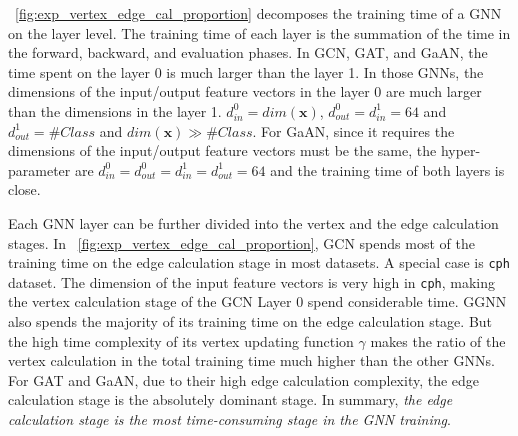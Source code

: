 \figurename~\ref{fig:exp_vertex_edge_cal_proportion} decomposes the training time of a GNN on the layer level.
The training time of each layer is the summation of the time in the forward, backward, and evaluation phases.
In GCN, GAT, and GaAN, the time spent on the layer 0 is much larger than the layer 1.
In those GNNs, the dimensions of the input/output feature vectors in the layer 0 are much larger than the dimensions in the layer 1.
$d^0_{in}=dim(\boldsymbol{x})$, $d^0_{out}=d^1_{in}=64$ and $d^1_{out}=\#Class$ and $dim(\boldsymbol{x}) \gg \#Class$.
For GaAN, since it requires the dimensions of the input/output feature vectors must be the same, the hyper-parameter are $d^0_{in}=d^0_{out}=d^1_{in}=d^1_{out}=64$ and the training time of both layers is close.

Each GNN layer can be further divided into the vertex and the edge calculation stages.
In \figurename~\ref{fig:exp_vertex_edge_cal_proportion}, GCN spends most of the training time on the edge calculation stage in most datasets.
A special case is \texttt{cph} dataset.
The dimension of the input feature vectors is very high in \texttt{cph}, making the vertex calculation stage of the GCN Layer 0 spend considerable time.
GGNN also spends the majority of its training time on the edge calculation stage.
But the high time complexity of its vertex updating function $\gamma$ makes the ratio of the vertex calculation in the total training time much higher than the other GNNs.
For GAT and GaAN, due to their high edge calculation complexity, the edge calculation stage is the absolutely dominant stage.
In summary, \emph{the edge calculation stage is the most time-consuming stage in the GNN training}.

